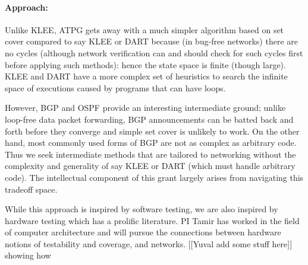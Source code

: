 \paragraph*{Approach:}

Unlike KLEE, ATPG gets away with a much simpler algorithm based on set cover compared to say KLEE or DART because (in bug-free networks) there are no cycles (although network verification can and should check for such cycles first before applying such methods): hence the state space is finite (though large).   KLEE and DART have a more complex set of heuristics to search the infinite 
space of executions caused by programs that can have loops.   

However, BGP and OSPF provide
an interesting intermediate ground; unlike loop-free data packet forwarding, BGP announcements can be batted back and forth before they converge
and simple set cover is unlikely to work.   On the other hand, most commonly used forms of BGP are not as complex as arbitrary code.
Thus we seek intermediate methods that are tailored to networking without the complexity and generality of
say KLEE or DART (which must handle arbitrary code).   The intellectual component of this grant largely arises from navigating this tradeoff space.  

While this approach is inspired by software testing, we are also inspired by hardware testing which has a prolific literature.  PI Tamir has worked in the field of computer architecture and will pursue the connections between hardware notions of testability and coverage, and networks.  [[Yuval add some stuff here]]
showing how 


